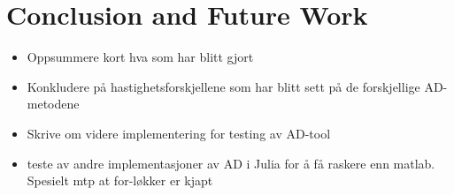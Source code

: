 \chapter{Conclusion and Future Work}
\begin{itemize}
    \item Oppsummere kort hva som har blitt gjort
    \item Konkludere på hastighetsforskjellene som har blitt sett på de forskjellige AD-metodene
    \item Skrive om videre implementering for testing av AD-tool
    \item teste av andre implementasjoner av AD i Julia for å få raskere enn matlab. Spesielt mtp at for-løkker er kjapt
\end{itemize}